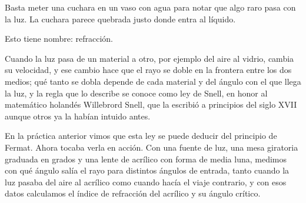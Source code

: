Basta meter una cuchara en un vaso con agua para notar que algo raro pasa con la luz. La cuchara parece quebrada justo donde entra al líquido.

Esto tiene nombre: refracción.

Cuando la luz pasa de un material a otro, por ejemplo del aire al vidrio, cambia su velocidad, y ese cambio hace que el rayo se doble en la frontera entre los dos medios; qué tanto se dobla depende de cada material y del ángulo con el que llega la luz, y la regla que lo describe se conoce como ley de Snell, en honor al matemático holandés Willebrord Snell, que la escribió a principios del siglo XVII aunque otros ya la habían intuido antes.

En la práctica anterior vimos que esta ley se puede deducir del principio de Fermat. Ahora tocaba verla en acción. Con una fuente de luz, una mesa giratoria graduada en grados y una lente de acrílico con forma de media luna, medimos con qué ángulo salía el rayo para distintos ángulos de entrada, tanto cuando la luz pasaba del aire al acrílico como cuando hacía el viaje contrario, y con esos datos calculamos el índice de refracción del acrílico y su ángulo crítico.
